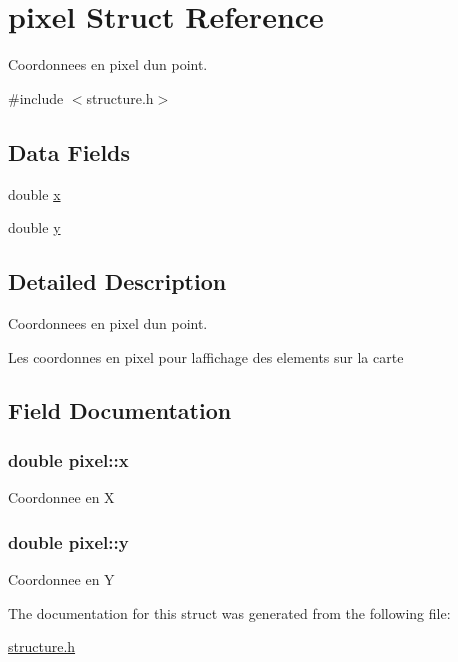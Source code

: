 \hypertarget{structpixel}{}\section{pixel Struct Reference}
\label{structpixel}


Coordonnees en pixel d\textquotesingle{}un point.  




{\ttfamily \#include $<$structure.\+h$>$}

\subsection*{Data Fields}
\begin{DoxyCompactItemize}
\item 
double \hyperlink{structpixel_a6609741bc1291a054dee60de6d93267a}{x}
\item 
double \hyperlink{structpixel_af6b283d71a65e8e7c2ea477912b7be63}{y}
\end{DoxyCompactItemize}


\subsection{Detailed Description}
Coordonnees en pixel d\textquotesingle{}un point. 

Les coordonnes en pixel pour l\textquotesingle{}affichage des elements sur la carte 

\subsection{Field Documentation}
\subsubsection[{\texorpdfstring{x}{x}}]{\setlength{\rightskip}{0pt plus 5cm}double pixel\+::x}\hypertarget{structpixel_a6609741bc1291a054dee60de6d93267a}{}\label{structpixel_a6609741bc1291a054dee60de6d93267a}
Coordonnee en X 
\subsubsection[{\texorpdfstring{y}{y}}]{\setlength{\rightskip}{0pt plus 5cm}double pixel\+::y}\hypertarget{structpixel_af6b283d71a65e8e7c2ea477912b7be63}{}\label{structpixel_af6b283d71a65e8e7c2ea477912b7be63}
Coordonnee en Y 

The documentation for this struct was generated from the following file\+:\begin{DoxyCompactItemize}
\item 
\hyperlink{structure_8h}{structure.\+h}\end{DoxyCompactItemize}
